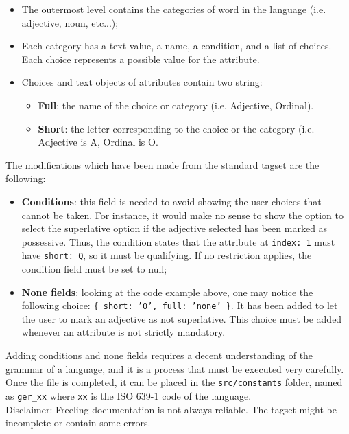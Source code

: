 \begin{itemize}
\item The outermost level contains the categories of word in the language (i.e. adjective, noun, etc...);
\item Each category has a text value, a name, a condition, and a list of choices. Each choice represents a possible value for the attribute.
\item Choices and text objects of attributes contain two string:
	\begin{itemize}
	\item \textbf{Full}: the name of the choice or category (i.e. Adjective, Ordinal).
	\item \textbf{Short}: the letter corresponding to the choice or the category (i.e. Adjective is A, Ordinal is O.
	\end{itemize}
\end{itemize}
The modifications which have been made from the standard tagset are the following:
\begin{itemize}
\item \textbf{Conditions}: this field is needed to avoid showing the user choices that cannot be taken. For instance, it would make no sense to show the option to select the superlative option if the adjective selected has been marked as possessive. Thus, the condition states that the attribute at \texttt{index: 1} must have \texttt{short: Q}, so it must be qualifying. If no restriction applies, the condition field must be set to null;
\item \textbf{None fields}: looking at the code example above, one may notice the following choice: \texttt{\{ short: '0', full: 'none' \}}. It has been added to let the user to mark an adjective as not superlative. This choice must be added whenever an attribute is not strictly mandatory.
\end{itemize}
Adding conditions and none fields requires a decent understanding of the grammar of a language, and it is a process that must be executed very carefully.\\
Once the file is completed, it can be placed in the \texttt{src/constants} folder, named as \texttt{ger\_xx} where \texttt{xx} is the ISO 639-1 code of the language.\\
Disclaimer: Freeling documentation is not always reliable. The tagset might be incomplete or contain some errors.






